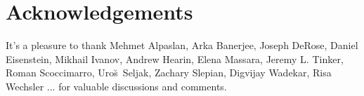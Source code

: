 \documentclass[12pt, letterpaper, preprint]{aastex63}
\begin{document}





 





 

\section*{Acknowledgements}
It's a pleasure to thank 
    Mehmet Alpaslan, 
    Arka Banerjee, 
    Joseph DeRose, 
    Daniel Eisenstein, 
    Mikhail Ivanov, 
    Andrew Hearin,
    Elena Massara,
    Jeremy L. Tinker,
    Roman Scoccimarro, 
    Uro{\u s}~Seljak,
    Zachary Slepian, 
    Digvijay Wadekar,
    Risa Wechsler
    ...
for valuable discussions and comments. 



 
\end{document}
